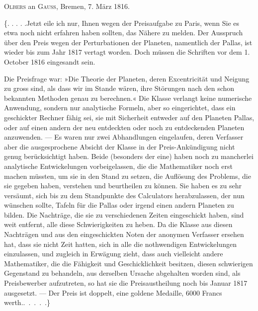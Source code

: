 \par{}\bigskip
\begin{center}
\textsc{Olbers} an \textsc{Gauss}, Bremen, 7. März 1816.
\end{center}
\noindent\hspace*{\parindent}\{. . . . .\quad Jetzt eile ich nur, Ihnen wegen der Preisaufgabe zu Paris, wenn Sie es etwa noch nicht erfahren haben sollten, das Nähere zu melden. Der Ausspruch über den Preis wegen der Perturbationen der Planeten, namentlich der Pallas, ist wieder bis zum Jahr 1817 vertagt worden. Doch müssen die Schriften vor dem 1. October 1816 eingesandt sein.
\par Die Preisfrage war: »Die Theorie der Planeten, deren Excentricität und Neigung zu gross sind, als dass wir im Stande wären, ihre Störungen nach den schon bekannten Methoden genau zu berechnen.« Die Klasse verlangt keine numerische Anwendung, sondern nur analytische Formeln, aber so eingerichtet, dass ein geschickter Rechner fähig sei, sie mit Sicherheit entweder auf den Planeten Pallas, oder auf einen andern der neu entdeckten oder noch zu entdeckenden Planeten anzuwenden. — Es waren nur zwei Abhandlungen eingelaufen, deren Verfasser aber die ausgesprochene Absicht der Klasse in der Preis-Ankündigung nicht genug berücksichtigt haben. Beide (besonders der eine) haben noch zu mancherlei analytische Entwickelungen vorbeigelassen, die die Mathematiker noch erst machen müssten, um sie in den Stand zu setzen, die Auflösung des Problems, die sie gegeben haben, verstehen und beurtheilen zu können. Sie haben es zu sehr versäumt, sich bis zu dem Standpunkte des Calculators herabzulassen, der nun wünschen sollte, Tafeln für die Pallas oder irgend einen andern Planeten zu bilden. Die Nachträge, die sie zu verschiedenen Zeiten eingeschickt haben, sind weit entfernt, alle diese Schwierigkeiten zu heben. Da die Klasse aus diesen Nachträgen und aus den eingeschickten Noten der anonymen Verfasser ersehen hat, dass sie nicht Zeit hatten, sich in alle die nothwendigen Entwickelungen einzulassen, und zugleich in Erwägung zieht, dass auch vielleicht andere Mathematiker, die die Fähigkeit und Geschicklichkeit besitzen, diesen schwierigen Gegenstand zu behandeln, aus derselben Ursache abgehalten worden sind, als Preisbewerber aufzutreten, so hat sie die Preisaustheilung noch bis Januar 1817 ausgesetzt. — Der Preis ist doppelt, eine goldene Medaille, 6000 Francs werth.\quad\mbox{. . . . .\}}
\par
